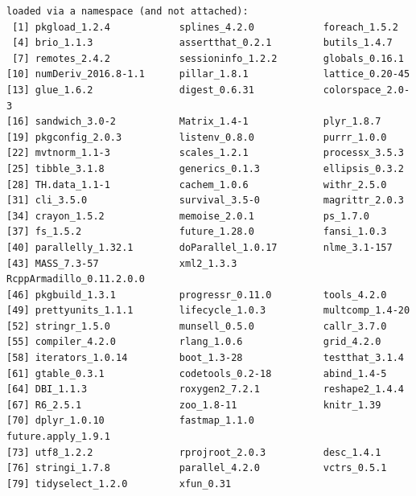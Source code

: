 \documentclass[12pt]{article}
\begin{document}
\begin{verbatim}
loaded via a namespace (and not attached):
 [1] pkgload_1.2.4            splines_4.2.0            foreach_1.5.2           
 [4] brio_1.1.3               assertthat_0.2.1         butils_1.4.7            
 [7] remotes_2.4.2            sessioninfo_1.2.2        globals_0.16.1          
[10] numDeriv_2016.8-1.1      pillar_1.8.1             lattice_0.20-45         
[13] glue_1.6.2               digest_0.6.31            colorspace_2.0-3        
[16] sandwich_3.0-2           Matrix_1.4-1             plyr_1.8.7              
[19] pkgconfig_2.0.3          listenv_0.8.0            purrr_1.0.0             
[22] mvtnorm_1.1-3            scales_1.2.1             processx_3.5.3          
[25] tibble_3.1.8             generics_0.1.3           ellipsis_0.3.2          
[28] TH.data_1.1-1            cachem_1.0.6             withr_2.5.0             
[31] cli_3.5.0                survival_3.5-0           magrittr_2.0.3          
[34] crayon_1.5.2             memoise_2.0.1            ps_1.7.0                
[37] fs_1.5.2                 future_1.28.0            fansi_1.0.3             
[40] parallelly_1.32.1        doParallel_1.0.17        nlme_3.1-157            
[43] MASS_7.3-57              xml2_1.3.3               RcppArmadillo_0.11.2.0.0
[46] pkgbuild_1.3.1           progressr_0.11.0         tools_4.2.0             
[49] prettyunits_1.1.1        lifecycle_1.0.3          multcomp_1.4-20         
[52] stringr_1.5.0            munsell_0.5.0            callr_3.7.0             
[55] compiler_4.2.0           rlang_1.0.6              grid_4.2.0              
[58] iterators_1.0.14         boot_1.3-28              testthat_3.1.4          
[61] gtable_0.3.1             codetools_0.2-18         abind_1.4-5             
[64] DBI_1.1.3                roxygen2_7.2.1           reshape2_1.4.4          
[67] R6_2.5.1                 zoo_1.8-11               knitr_1.39              
[70] dplyr_1.0.10             fastmap_1.1.0            future.apply_1.9.1      
[73] utf8_1.2.2               rprojroot_2.0.3          desc_1.4.1              
[76] stringi_1.7.8            parallel_4.2.0           vctrs_0.5.1             
[79] tidyselect_1.2.0         xfun_0.31
\end{verbatim}
\end{document}
